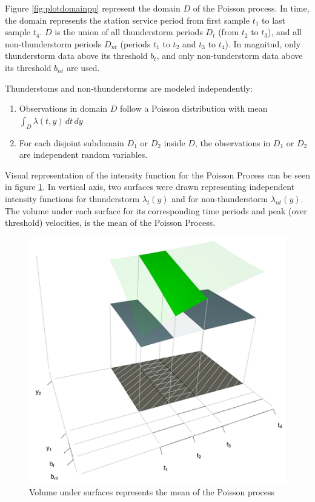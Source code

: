 \documentclass[12pt,twoside]{reedthesis}
\providecommand{\tightlist}{%
  \setlength{\itemsep}{0pt}\setlength{\parskip}{0pt}}
\begin{document}
Figure \ref{fig:plotdomainpp} represent the domain \(D\) of the Poisson process. In time, the domain represents the station service period from first sample \(t_1\) to last sample \(t_4\). \(D\) is the union of all thunderstorm periods \(D_t\) (from \(t_2\) to \(t_3\)), and all non-thunderstorm periods \(D_{nt}\) (periods \(t_1\) to \(t_2\) and \(t_3\) to \(t_4\)). In magnitud, only thunderstorm data above its threshold \(b_t\), and only non-tunderstorm data above its threshold \(b_{nt}\) are used.

Thunderstoms and non-thunderstorms are modeled independently:
\begin{enumerate}
\def\labelenumi{\arabic{enumi}.}
\tightlist
\item
  Observations in domain \(D\) follow a Poisson distribution with mean \(\int_D\lambda(t,y)\,dt\,dy\)
\item
  For each disjoint subdomain \(D_1\) or \(D_2\) inside \(D\), the observations in \(D_1\) or \(D_2\) are independent random variables.
\end{enumerate}
Visual representation of the intensity function for the Poisson Process can be seen in figure \ref{fig:plotdomain3dpp}. In vertical axis, two surfaces were drawn representing independent intensity functions for thunderstorm \(\lambda_t(y)\) and for non-thunderstorm \(\lambda_{nt}(y)\). The volume under each surface for its corresponding time periods and peak (over threshold) velocities, is the mean of the Poisson Process.

\footnotesize
\begin{figure}
\includegraphics[width=6.35in]{figure/domain3d} \caption{Volume under surfaces represents the mean of the Poisson process}\label{fig:plotdomain3dpp}
\end{figure}
\normalsize
\end{document}
